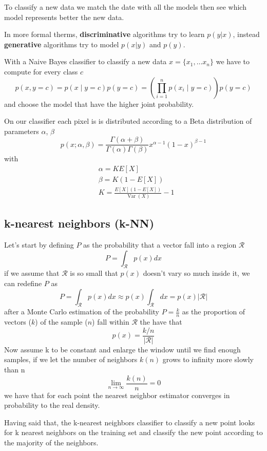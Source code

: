 \documentclass[12pt]{article}
\begin{document}
To classify a new data we match the date with all the models then see which model 
represents better the new data.

In more formal therms, \textbf{discriminative} algorithms try to learn $p(y|x)$, 
instead \textbf{generative} algorithms try to model $p(x|y)$ and $p(y)$.

With a Naive Bayes classifier to classify a new data $x = \{x_1,\dots x_n\}$ we have 
to compute for every class $c$
$$
p(x, y=c)=p(x \mid y=c) p(y=c)=\left(\prod_{i=1}^{n} p\left(x_i \mid y=c\right)\right) p(y=c)
$$
and choose the model that have the higher joint probability.

On our classifier each pixel is is distributed according to a Beta distribution of 
parameters $\alpha$, $\beta$
$$
p(x ; \alpha, \beta)=\frac{\Gamma(\alpha+\beta)}{\Gamma(\alpha) \Gamma(\beta)} x^{\alpha-1}(1-x)^{\beta-1}
$$
with
$$
\begin{aligned}
& \alpha=K E[X] \\
& \beta=K(1-E[X]) \\
& K=\frac{E[X](1-E[X])}{\operatorname{Var}(X)}-1
\end{aligned}
$$

\subsection{k-nearest neighbors (k-NN)}

Let's start by defining $P$ as the probability that a vector fall into a region $\mathcal{R}$
$$
    P=\int_{\mathcal{R}} p(x) d x
$$
if we assume that $\mathcal{R}$ is so small that $p(x)$ doesn't vary so much inside it,
we can redefine $P$ as
$$
    P=\int_{\mathcal{R}} p(x) d x \approx p(x) \int_{\mathcal{R}} d x=p(x)|\mathcal{R}|
$$
after a Monte Carlo estimation of the probability $P = \frac{k}{n}$ as the proportion
of vectors ($k$) of the sample ($n$) fall within $\mathcal{R}$ the have that
$$
    p(x) = \frac{k/n}{|\mathcal{R}|}
$$
Now assume k to be constant and enlarge the window until we find enough samples, if
we let the number of neighbors $k(n)$  grows to infinity more slowly than n
$$
    \lim _{n \rightarrow \infty} \frac{k(n)}{n}=0
$$
we have that for each point the nearest neighbor estimator converges in
probability to the real density.

Having said that, the k-nearest neighbors classifier to classify a new point looks for
k nearest neighbors on the training set and classify the new point according to the 
majority of the neighbors.
\end{document}

